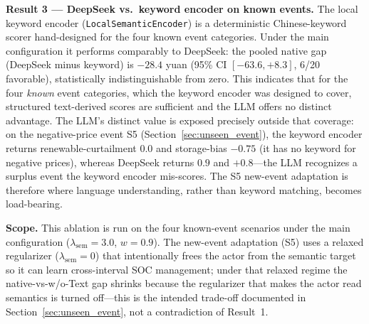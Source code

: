 \textbf{Result 3 — DeepSeek vs.\ keyword encoder on known events.} The local
keyword encoder (\texttt{LocalSemanticEncoder}) is a deterministic Chinese-keyword
scorer hand-designed for the four known event categories. Under the main
configuration it performs comparably to DeepSeek: the pooled native gap
(DeepSeek minus keyword) is $-28.4$ yuan (95\% CI $[-63.6, +8.3]$, 6/20 favorable),
statistically indistinguishable from zero. This indicates that for the four
\emph{known} event categories, which the keyword encoder was designed to cover,
structured text-derived scores are sufficient and the LLM offers no distinct
advantage. The LLM's distinct value is exposed precisely outside that coverage:
on the negative-price event S5 (Section~\ref{sec:unseen_event}), the keyword
encoder returns renewable-curtailment $0.0$ and storage-bias $-0.75$ (it has no
keyword for negative prices), whereas DeepSeek returns $0.9$ and $+0.8$---the
LLM recognizes a surplus event the keyword encoder mis-scores. The S5
new-event adaptation is therefore where language understanding, rather than
keyword matching, becomes load-bearing.

\textbf{Scope.} This ablation is run on the four known-event scenarios under the
main configuration ($\lambda_{\mathrm{sem}}=3.0$, $w=0.9$). The new-event adaptation
(S5) uses a relaxed regularizer ($\lambda_{\mathrm{sem}}=0$) that intentionally
frees the actor from the semantic target so it can learn cross-interval SOC
management; under that relaxed regime the native-vs-w/o-Text gap shrinks because
the regularizer that makes the actor read semantics is turned off---this is the
intended trade-off documented in Section~\ref{sec:unseen_event}, not a
contradiction of Result~1.

